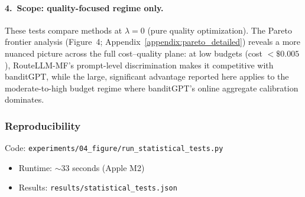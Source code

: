 \paragraph{4.\ Scope: quality-focused regime only.}
These tests compare methods at $\lambda{=}0$ (pure quality optimization).
The Pareto frontier analysis (Figure~4; Appendix~\ref{appendix:pareto_detailed})
reveals a more nuanced picture across the full cost--quality plane: at low
budgets (cost $< \$0.005$), RouteLLM-MF's prompt-level discrimination
makes it competitive with banditGPT, while the large, significant advantage
reported here applies to the moderate-to-high budget regime where banditGPT's
online aggregate calibration dominates.

\subsubsection{Reproducibility}

Code: \texttt{experiments/04\_figure/run\_statistical\_tests.py}

\begin{itemize}[noitemsep]
    \item Runtime: ${\sim}33$ seconds (Apple M2)
    \item Results: \texttt{results/statistical\_tests.json}
\end{itemize}
